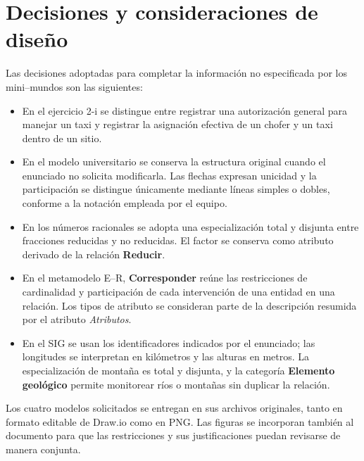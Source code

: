\section{Decisiones y consideraciones de diseño}

Las decisiones adoptadas para completar la información no especificada por
los mini--mundos son las siguientes:

\begin{itemize}
  \item En el ejercicio 2-i se distingue entre registrar una autorización
        general para manejar un taxi y registrar la asignación efectiva de un
        chofer y un taxi dentro de un sitio.
  \item En el modelo universitario se conserva la estructura original cuando
        el enunciado no solicita modificarla. Las flechas expresan unicidad y
        la participación se distingue únicamente mediante líneas simples o
        dobles, conforme a la notación empleada por el equipo.
  \item En los números racionales se adopta una especialización total y
        disjunta entre fracciones reducidas y no reducidas. El factor se
        conserva como atributo derivado de la relación \textbf{Reducir}.
  \item En el metamodelo E--R, \textbf{Corresponder} reúne las restricciones de
        cardinalidad y participación de cada intervención de una entidad en
        una relación. Los tipos de atributo se consideran parte de la
        descripción resumida por el atributo \emph{Atributos}.
  \item En el SIG se usan los identificadores indicados por el enunciado; las
        longitudes se interpretan en kilómetros y las alturas en metros. La
        especialización de montaña es total y disjunta, y la categoría
        \textbf{Elemento geológico} permite monitorear ríos o montañas sin
        duplicar la relación.
\end{itemize}

Los cuatro modelos solicitados se entregan en sus archivos originales, tanto
en formato editable de Draw.io como en PNG. Las figuras se incorporan también al documento para que
las restricciones y sus justificaciones puedan revisarse de manera conjunta.

